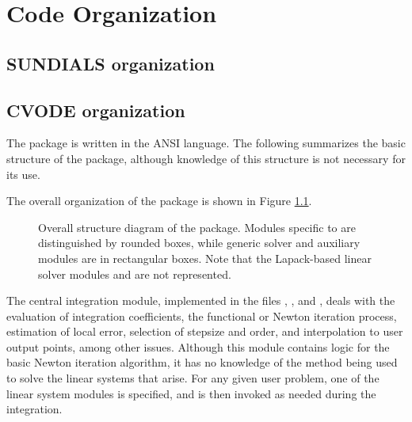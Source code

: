 \chapter{Code Organization}\label{s:organization}

\section{SUNDIALS organization}\label{ss:sun_org}


\section{CVODE organization}\label{ss:cvode_org}

The {\cvode} package is written in the ANSI {\C} language. The following
summarizes the basic structure of the package, although knowledge
of this structure is not necessary for its use.

The overall organization of the {\cvode} package is shown in Figure
\ref{f:cvorg}. 
\begin{figure}
{\centerline{}}
\caption [Overall structure diagram of the {\cvode} package]
{Overall structure diagram of the {\cvode} package.
  Modules specific to {\cvode} are distinguished by rounded boxes, while 
  generic solver and auxiliary modules are in rectangular boxes. Note that 
  the Lapack-based linear solver modules {\cvlapdense} and {\cvlapband}
  are not represented.}
\label{f:cvorg}
\end{figure}
The central integration module, implemented in the files ,
, and , deals with the evaluation of integration
coefficients, the functional or Newton iteration process, estimation of local
error, selection of stepsize and order, and interpolation to user output
points, among other issues.  Although this module contains logic for
the basic Newton iteration algorithm, it has no knowledge of the
method being used to solve the linear systems that arise.  For any
given user problem, one of the linear system modules is specified, and
is then invoked as needed during the integration. 

